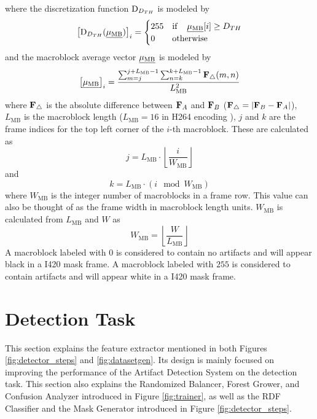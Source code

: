 where the discretization function $\text{D}_{D_{TH}}$ is modeled by
%
\begin{equation}
  \label{eq:D}
  \left[\text{D}_{D_{TH}}(\underline{\mathbf{\mu_{\text{MB}}}})\right]_i = \begin{cases}
    255 & \text{if\hspace{0.4cm}} \underline{\mathbf{\mu_{\text{MB}}}}[i] \ge D_{TH} \\
    0   & \text{otherwise}
  \end{cases}
\end{equation}
%
and the macroblock average vector $\underline{\mathbf{\mu_{\text{MB}}}}$ is modeled by
%
\def\FD{\mat{F_\triangle}}
\def\MBL{L_{\text{MB}}}
\def\MBW{W_{\text{MB}}}
\def\MBH{H_{\text{MB}}}
\begin{equation}
  \label{eq:MDA}
  \left[\VMU\right]_i = \frac{\sum_{m=j}^{j+\MBL-1} \sum_{n=k}^{k+\MBL-1} \FD(m,n)}{\MBL^2}
\end{equation}
%
where $\FD$ is the absolute difference between $\mathbf{F}_A$ and $\mathbf{F}_B$ ($\FD=| \FB - \FA |$), $\MBL$ is the macroblock length ($\MBL=16$ in H264 encoding \cite{h264}), $j$ and $k$ are the frame indices for the top left corner of the $i$-th macroblock. These are calculated as
%
\begin{equation}
  \label{eq:mbj}
  j= \MBL \cdot \left\lfloor \frac{i}{\MBW} \right\rfloor
\end{equation}
%
and
%
\begin{equation}
  \label{eq:mbk}
  k = \MBL \cdot \left(i \mod{\MBW}\right)
\end{equation}
%
where $\MBW$ is the integer number of macroblocks in a frame row. This value can also be thought of as the frame width in macroblock length units. $\MBW$ is calculated from $\MBL$ and $W$ as
%
\begin{equation}
  \label{eq:mbw}
  \MBW = \left\lfloor \frac{W}{\MBL} \right\rfloor
\end{equation}
%
A macroblock labeled with $0$ is considered to contain no artifacts and will appear black in a I420 mask frame. A macroblock labeled with $255$ is considered to contain artifacts and will appear white in a I420 mask frame.

\section{Detection Task}
\label{sec:sol_metrics}

This section explains the feature extractor mentioned in both Figures \ref{fig:detector_steps} and \ref{fig:datasetgen}. Its design is mainly focused on improving the performance of the Artifact Detection System on the detection task. This section also explains the Randomized Balancer, Forest Grower, and Confusion Analyzer introduced in Figure \ref{fig:trainer}, as well as the RDF Classifier and the Mask Generator introduced in Figure \ref{fig:detector_steps}.

